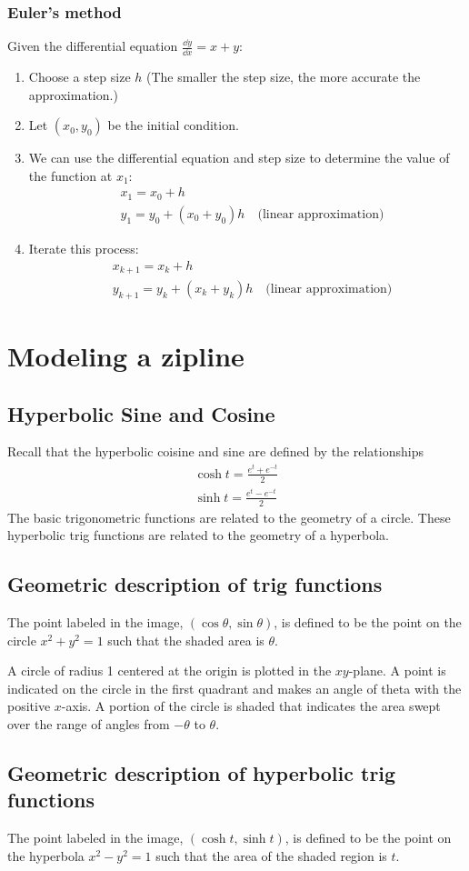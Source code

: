 \subsubsection{Euler's method}
Given the differential equation $\frac{\dd y}{\dd x}=x+y$:
\begin{enumerate}
\item Choose a step size $h$ (The smaller the step size, the more accurate the approximation.)
\item Let $(x_0,y_0)$ be the initial condition.
\item We can use the differential equation and step size to determine the value of the function at $x_1$:
  \begin{align*}
  & x_1=x_0+h\\
  & y_1=y_0+(x_0+y_0)h\quad\text{(linear approximation)}
  \end{align*}
\item Iterate this process:
  \begin{align*}
  & x_{k+1}=x_k+h\\
  & y_{k+1}=y_k+(x_k+y_k)h\quad\text{(linear approximation)}
  \end{align*}
\end{enumerate}
\section{Modeling a zipline}
\subsection{Hyperbolic Sine and Cosine}
Recall that the hyperbolic coisine and sine are defined by the relationships
\begin{gather*}
\cosh t=\frac{e^t+e^{-t}}2\\
\sinh t=\frac{e^t-e^{-t}}2
\end{gather*}
The basic trigonometric functions are related to the geometry of a circle. These hyperbolic trig functions are related to the geometry of a hyperbola.
\subsection{Geometric description of trig functions}
The point labeled in the image, $(\cos\theta,\sin\theta)$, is defined to be the point on the circle $x^2+y^2=1$ such that the shaded area is $\theta$.

A circle of radius 1 centered at the origin is plotted in the $xy$-plane. A point is indicated on the circle in the first quadrant and makes an angle of theta with the positive $x$-axis. A portion of the circle is shaded that indicates the area swept over the range of angles from $-\theta$ to $\theta$.
\subsection{Geometric description of hyperbolic trig functions}
The point labeled in the image, $(\cosh t, \sinh t)$, is defined to be the point on the hyperbola $x^2-y^2=1$ such that the area of the shaded region is $t$.

